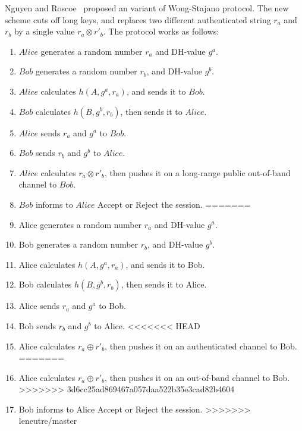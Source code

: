 \begin{enumerate}
\begin{enumerate}
Nguyen and Roscoe~\cite{Nguyen09authenticationprotocols} proposed an variant of Wong-Stajano protocol. The new scheme cuts off long keys, and replaces two different authenticated string $r_a$ and $r_b$ by a single value $r_a\otimes r'_b$. The protocol works as follows:
\begin{enumerate}
<<<<<<< HEAD
\item $Alice$ generates a random number $r_a$ and DH-value $g^a$.
\item $Bob$ generates a random number $r_b$, and DH-value $g^b$.
\item $Alice$ calculates $h(A,g^a,r_a)$, and sends it to $Bob$. 
\item $Bob$ calculates $h(B,g^b,r_b)$, then sends it to $Alice$.
\item $Alice$ sends $r_a$ and $g^a$ to $Bob$. 
\item $Bob$ sends $r_b$ and $g^b$ to $Alice$. 
\item $Alice$ calculates $r_a\otimes r'_b$, then pushes it on a long-range public out-of-band channel to $Bob$. 
\item $Bob$ informs to $Alice$ Accept or Reject the session.
=======
\item Alice generates a random number $r_a$ and DH-value $g^a$.
\item Bob generates a random number $r_b$, and DH-value $g^b$.
\item Alice calculates $h(A,g^a,r_a)$, and sends it to Bob. 
\item Bob calculates $h(B,g^b,r_b)$, then sends it to Alice.
\item Alice sends $r_a$ and $g^a$ to Bob. 
\item Bob sends $r_b$ and $g^b$ to Alice. 
<<<<<<< HEAD
\item Alice calculates $r_a\oplus r'_b$, then pushes it on an authenticated channel to Bob. 
=======
\item Alice calculates $r_a\oplus r'_b$, then pushes it on an out-of-band channel to Bob. 
>>>>>>> 3d6cc25ad869467a057daa522b35e3cad82b4604
\item Bob informs to Alice Accept or Reject the session.
>>>>>>> leneutre/master
\end{enumerate}


\end{enumerate}
\end{enumerate}
